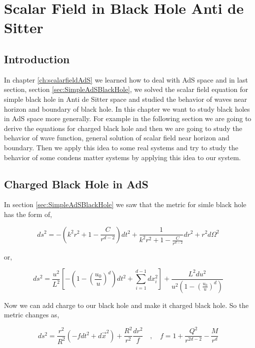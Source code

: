 \chapter{Scalar Field in Black Hole Anti de Sitter}
\label{ch:AdSBlackHole}

\section{Introduction}

In chapter \ref{ch:scalarfieldAdS} we learned how to deal with AdS space and in last section, section \ref{sec:SimpleAdSBlackHole}, we solved the scalar field equation for simple black hole in Anti de Sitter space and studied the behavior of waves near horizon and boundary of black hole. In this chapter we want to study black holes in AdS space more generally. For example in the following section we are going to derive the equations for charged black hole and then we are going to study the behavior of wave function, general solution of scalar field near horizon and boundary. Then we apply this idea to some real systems and try to study the behavior of some condens matter systems by applying this idea to our system.\\

\section{Charged Black Hole in AdS}

In section \ref{sec:SimpleAdSBlackHole} we saw that the metric for simle black hole has the form of,

\begin{equation}
    ds^2 = - \left( k^2r^2 + 1 - \frac{C}{r^{d-2}} \right)dt^2 + \frac{1}{k^2r^2 + 1 - \frac{C}{r^{d-2}}}dr^2 + r^2 d\Omega^2
\end{equation}

or,

\begin{equation}
    ds^2 = \frac{u^2}{L^2} \left[ -(1-(\frac{u_0}{u})^d) dt^2 + \sum\limits_{i=1}^{d-1} dx_i^2 \right] + \frac{L^2 du^2}{u^2 (1-(\frac{u_0}{u})^d)}
\end{equation}

Now we can add charge to our black hole and make it charged black hole. So the metric changes as,

\begin{equation} \label{eq:ChargedBlackHoleAdSMetric}
    ds^2 = \frac{r^2}{R^2}(-fdt^2 + d\vec{x}^2) + \frac{R^2}{r^2}\frac{dr^2}{f} \quad , \quad f = 1+\frac{Q^2}{r^{2d-2}}-\frac{M}{r^d}
\end{equation}


